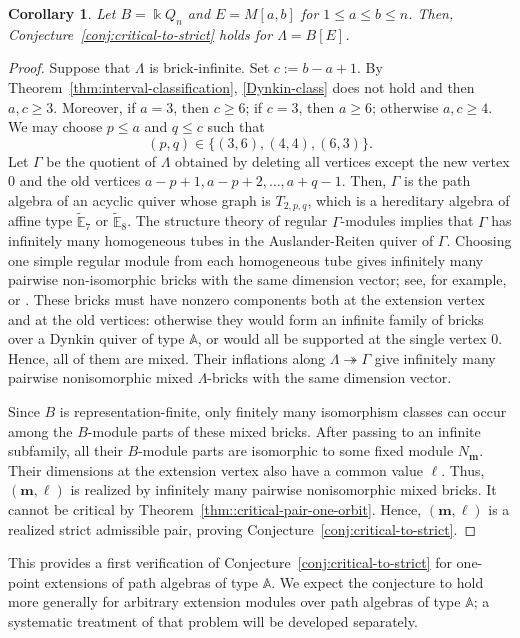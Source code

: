 \documentclass[a4,12pt]{amsart}
\numberwithin{equation}{section} %
\newtheorem{corollary}[theorem]{Corollary} %
\theoremstyle{definition} %
\begin{document}
\begin{corollary}
Let $B=\Bbbk Q_n$ and $E=M[a,b]$ for $1\leq a\leq b\leq n$. Then, Conjecture~\ref{conj:critical-to-strict} holds for $\Lambda=B[E]$.
\end{corollary}
\begin{proof}
Suppose that $\Lambda$ is brick-infinite. Set $c:=b-a+1$. By Theorem~\ref{thm:interval-classification}, \eqref{Dynkin-class} does not hold and then $a,c\geq3$. Moreover, if $a=3$, then $c\geq6$; if $c=3$, then $a\geq6$; otherwise $a,c\geq4$. We may choose $p\leq a$ and $q\leq c$ such
that
\[
(p,q)\in\{(3,6),(4,4),(6,3)\}.
\]
Let $\Gamma$ be the quotient of $\Lambda$ obtained by deleting all vertices except the new vertex $0$ and the old vertices $a-p+1,a-p+2,\ldots,a+q-1$. Then, $\Gamma$ is the path algebra of an acyclic quiver whose graph is $T_{2,p,q}$, which is a hereditary algebra of affine type $\widetilde{\mathbb{E}}_7$ or $\widetilde{\mathbb{E}}_8$. The structure theory of regular $\Gamma$-modules implies that $\Gamma$ has infinitely many homogeneous tubes in the Auslander-Reiten quiver of $\Gamma$. Choosing one simple regular module from each homogeneous tube gives infinitely many pairwise non-isomorphic bricks with the same dimension vector; see, for example, \cite[XIII.2]{SS-II} or \cite[Chapter~3]{RingelTame}. These bricks must have nonzero components both at the extension vertex and at the old vertices: otherwise they would form an infinite family of bricks over a Dynkin quiver of type $\mathbb{A}$, or would all be supported at the single vertex $0$. Hence, all of them are mixed. Their inflations along $\Lambda\twoheadrightarrow\Gamma$ give infinitely many pairwise nonisomorphic mixed $\Lambda$-bricks with the same dimension vector.

Since $B$ is representation-finite, only finitely many isomorphism classes can occur among the $B$-module parts of these mixed bricks. After passing to an infinite subfamily, all their $B$-module parts are isomorphic to some fixed module $N_{\mathbf{m}}$. Their dimensions at the extension vertex also have a common value $\ell$. Thus, $(\mathbf{m},\ell)$ is realized by infinitely many pairwise nonisomorphic mixed bricks. It cannot be critical by Theorem~\ref{thm::critical-pair-one-orbit}. Hence, $(\mathbf{m},\ell)$ is a realized strict admissible pair, proving
Conjecture~\ref{conj:critical-to-strict}.
\end{proof}

This provides a first verification of Conjecture~\ref{conj:critical-to-strict} for one-point extensions of path algebras of type $\mathbb{A}$. We expect the conjecture to hold more generally for arbitrary extension modules over path algebras of type $\mathbb{A}$; a systematic treatment of that problem will be developed separately.
\end{document}
